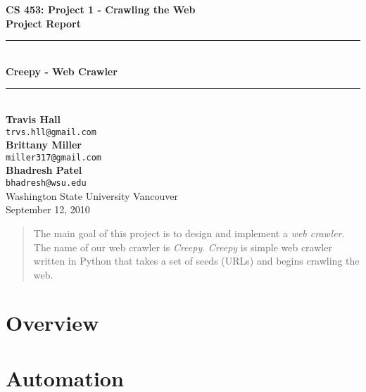\documentclass[letterpaper,11pt,twoside]{article}
\begin{document}
\begin{titlepage}
   \begin{center}
       {\Large \textbf{CS 453: Project 1 - Crawling the Web}}\\[0.5cm]
       {\Large \textbf{Project Report}}\\[3.0cm]

       {\rule{\linewidth}{0.5mm}} \\[0.5cm]
       {\Huge \textbf{Creepy - Web Crawler}}\\[0.4cm] 
       {\rule{\linewidth}{0.5mm}} \\[2.0cm]

       \textbf{Travis Hall}\\
       \texttt{trvs.hll@gmail.com}\\[0.5cm]
       \textbf{Brittany Miller}\\
       \texttt{miller317@gmail.com}\\[0.5cm]
       \textbf{Bhadresh Patel}\\
       \texttt{bhadresh@wsu.edu}\\[0.5cm]

       \vfill
       Washington State University Vancouver\\
       September 12, 2010
   \end{center}
\end{titlepage}

\begin{abstract}
The main goal of this project is to design and implement a \emph{web crawler}. The name of our web crawler is \emph{Creepy}. \emph{Creepy} is simple web crawler written in Python that takes a set of seeds (URLs) and begins crawling the web.
\end{abstract}

\section{Overview}

\section{Automation}
\end{document}
